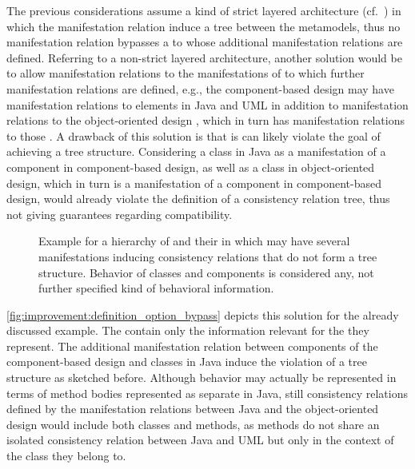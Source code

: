 The previous considerations assume a kind of strict layered architecture (cf.~\cite{buschmann1996PatternsArchitecture-Book}) in which the manifestation relation induce a tree between the metamodels, thus no manifestation relation bypasses a \conceptmetamodel to whose \commonalities additional manifestation relations are defined.
Referring to a non-strict layered architecture, another solution would be to allow manifestation relations to the manifestations of \conceptmetamodels to which further manifestation relations are defined, e.g., the component-based design \commonalities may have manifestation relations to elements in Java and \gls{UML} in addition to manifestation relations to the object-oriented design \conceptmetamodels, which in turn has manifestation relations to those \concretemetamodels.
A drawback of this solution is that is can likely violate the goal of achieving a tree structure.
Considering a class in Java as a manifestation of a component in component-based design, as well as a class in object-oriented design, which in turn is a manifestation of a component in component-based design, would already violate the definition of a consistency relation tree, thus not giving guarantees regarding compatibility.

\begin{figure}
    \centering
    
    \caption[\Commonalities with multiple manifestation]{Example for a hierarchy of \conceptmetamodels and their \commonalities in which \commonalities may have several manifestations inducing consistency relations that do not form a tree structure. Behavior of classes and components is considered any, not further specified kind of behavioral information.}
    \label{fig:improvement:definition_option_bypass}
\end{figure}

\autoref{fig:improvement:definition_option_bypass} depicts this solution for the already discussed example.
The \conceptmetamodels contain only the information relevant for the \commonalities they represent.
The additional manifestation relation between components of the component-based design \conceptmetamodel and classes in Java induce the violation of a tree structure as sketched before.
Although behavior may actually be represented in terms of method bodies represented as separate \metaclasses in Java, still consistency relations defined by the manifestation relations between Java and the object-oriented design \conceptmetamodel would include both classes and methods, as methods do not share an isolated consistency relation between Java and \gls{UML} but only in the context of the class they belong to.

